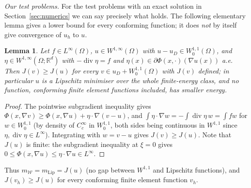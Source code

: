 \documentclass[11pt]{amsart}
\newtheorem{lemma}[theorem]{Lemma}
\theoremstyle{definition}
\theoremstyle{remark}
\numberwithin{equation}{section}
\newcommand{\R}{\mathbb{R}}
\DeclareMathOperator{\divg}{div}
\begin{document}
\emph{Our test problems.} For the test problems with an exact solution in Section~\ref{sec:numerics} we can say precisely what holds. The following elementary lemma gives a lower bound for every conforming function; it does \emph{not} by itself give convergence of $u_h$ to $u$.
\begin{lemma}\label{lem:nogap}
Let $f\in L^\infty(\Omega)$, $u\in W^{1,\infty}(\Omega)$ with $u-u_D\in W^{1,1}_0(\Omega)$, and $\eta\in W^{1,\infty}(\Omega;\R^d)$ with $-\divg\eta=f$ and $\eta(x)\in\partial\Phi(x,\cdot)(\nabla u(x))$ a.e. Then $J(v)\ge J(u)$ for every $v\in u_D+W^{1,1}_0(\Omega)$ with $J(v)$ defined; in particular $u$ is a Lipschitz minimiser over the whole finite-energy class, and no function, conforming finite element functions included, has smaller energy.
\end{lemma}
\begin{proof}
The pointwise subgradient inequality gives $\Phi(x,\nabla v)\ge\Phi(x,\nabla u)+\eta\cdot\nabla(v-u)$, and $\int\eta\cdot\nabla w=-\int\divg\eta\,w=\int fw$ for $w\in W^{1,1}_0$ (by density of $C^\infty_c$ in $W^{1,1}_0$, both sides being continuous in $W^{1,1}$ since $\eta,\divg\eta\in L^\infty$). Integrating with $w=v-u$ gives $J(v)\ge J(u)$. Note that $J(u)$ is finite: the subgradient inequality at $\xi=0$ gives $0\le\Phi(x,\nabla u)\le\eta\cdot\nabla u\in L^\infty$.
\end{proof}
Thus $m_{\mathcal W}=m_{\mathrm{Lip}}=J(u)$ (no gap between $W^{1,1}$ and Lipschitz functions), and $J(v_h)\ge J(u)$ for every conforming finite element function $v_h$.
\end{document}
